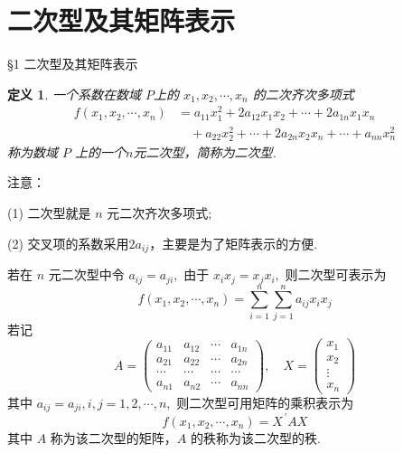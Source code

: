 \documentclass[13pt]{beamer}
\newtheorem*{defi}{定义}
\begin{document}
\section{ 二次型及其矩阵表示}
\begin{frame}{\S 1   二次型及其矩阵表示}

\begin{defi}
一个系数在数域 $P$上的 $x_{1}, x_{2}, \cdots, x_{n}$ 的二次齐次多项式
\[
\begin{aligned}
f\left(x_{1}, x_{2}, \cdots, x_{n}\right) &=a_{11} x_{1}^{2}+2 a_{12} x_{1} x_{2}+\cdots+2 a_{1 n} x_{1} x_{n} \\
& \quad +a_{22} x_{2}^{2}+\cdots+2 a_{2 n} x_{2} x_{n}+\cdots+a_{n n} x_{n}^{2}
\end{aligned}
\]
称为数域 $P$ 上的一个$n$元二次型，简称为二次型. 
\end{defi}
注意：

(1) 二次型就是 $n$ 元二次齐次多项式;

(2) 交叉项的系数采用$2a_{ij}$，主要是为了矩阵表示的方便. 
\end{frame}


\begin{frame}
若在 $n$ 元二次型中令 $a_{i j}=a_{j i},$ 由于 $x_{i} x_{j}=x_{j} x_{i},$ 则二次型可表示为
\[
f\left(x_{1}, x_{2}, \cdots, x_{n}\right)=\sum_{i=1}^{n} \sum_{j=1}^{n} a_{i j} x_{i} x_{j}
\]
若记
\[
A=\left(\begin{array}{cccc}
a_{11} & a_{12} & \cdots & a_{1 n} \\
a_{21} & a_{22} & \cdots & a_{2 n} \\
\cdots & \cdots & \cdots & \cdots \\
a_{n 1} & a_{n 2} & \cdots & a_{n n}
\end{array}\right), \quad
X=\left(\begin{array}{c}
x_{1} \\
x_{2} \\
\vdots \\
x_{n}
\end{array}\right)
\]
其中 $a_{i j}=a_{j i}, i, j=1,2, \cdots, n,$ 则二次型可用矩阵的乘积表示为
\[
f\left(x_{1}, x_{2}, \cdots, x_{n}\right)=X^{\, \prime} A X
\]
其中 $A$ 称为该\alert{二次型的矩阵}，$A$ 的秩称为该\alert{二次型的秩}. 
\end{frame}
\end{document}

